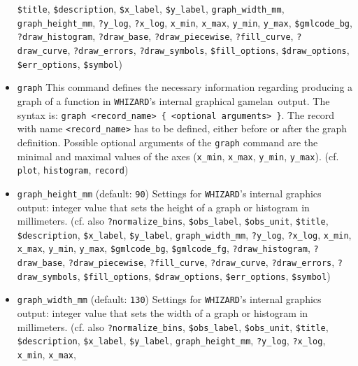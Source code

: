 \documentclass[12pt]{book}
\newcommand{\ttt}[1]{\texttt{#1}}
\newcommand{\whizard}{\texttt{WHIZARD}}
\newcommand{\gamelan}{\textsf{gamelan}}
\begin{document}
\begin{itemize}
\ttt{\$title}, \ttt{\$description}, \ttt{\$x\_label},
\ttt{\$y\_label}, \ttt{graph\_width\_mm}, \ttt{graph\_height\_mm}, 
\ttt{?y\_log}, \ttt{?x\_log}, \ttt{x\_min}, \ttt{x\_max},
\ttt{y\_min}, \ttt{y\_max}, \ttt{\$gmlcode\_bg},
\ttt{?draw\_histogram}, \ttt{?draw\_base}, \ttt{?draw\_piecewise},
\newline \ttt{?fill\_curve}, \ttt{?draw\_curve}, \ttt{?draw\_errors},
\ttt{?draw\_symbols}, \ttt{\$fill\_options}, \newline \ttt{\$draw\_options},
\ttt{\$err\_options}, \ttt{\$symbol})
\item
\ttt{graph} \newline
This command defines the necessary information regarding producing 
a graph of a function in \whizard's internal graphical \gamelan\
output. The syntax is: \ttt{graph <record\_name> \{ <optional 
arguments> \}}. The record with name \ttt{<record\_name>} has to be
defined, either before or after the graph definition. Possible optional
arguments of the \ttt{graph} command are the minimal and maximal values
of the axes (\ttt{x\_min}, \ttt{x\_max}, \ttt{y\_min}, \ttt{y\_max}). 
(cf. \ttt{plot}, \ttt{histogram}, \ttt{record})
\item
\ttt{graph\_height\_mm} \qquad (default: \ttt{90}) \newline
Settings for \whizard's internal graphics output: integer value that
sets the height of a graph or histogram in millimeters. (cf. also
\ttt{?normalize\_bins}, \ttt{\$obs\_label}, \ttt{\$obs\_unit},
\ttt{\$title}, \ttt{\$description}, \ttt{\$x\_label},
\ttt{\$y\_label}, \ttt{graph\_width\_mm}, 
\ttt{?y\_log}, \ttt{?x\_log}, \ttt{x\_min}, \ttt{x\_max},
\ttt{y\_min}, \ttt{y\_max}, \ttt{\$gmlcode\_bg}, \ttt{\$gmlcode\_fg},
\ttt{?draw\_histogram}, \ttt{?draw\_base}, \newline \ttt{?draw\_piecewise},
\ttt{?fill\_curve}, \ttt{?draw\_curve}, \ttt{?draw\_errors},
\ttt{?draw\_symbols}, \newline \ttt{\$fill\_options}, \ttt{\$draw\_options},
\ttt{\$err\_options}, \ttt{\$symbol})
\item
\ttt{graph\_width\_mm} \qquad (default: \ttt{130}) \newline
Settings for \whizard's internal graphics output: integer value that
sets the width of a graph or histogram in millimeters. (cf. also
\ttt{?normalize\_bins}, \ttt{\$obs\_label}, \ttt{\$obs\_unit},
\ttt{\$title}, \ttt{\$description}, \ttt{\$x\_label},
\ttt{\$y\_label}, \ttt{graph\_height\_mm}, 
\ttt{?y\_log}, \ttt{?x\_log}, \ttt{x\_min}, \ttt{x\_max},

\end{itemize}
\end{document}
